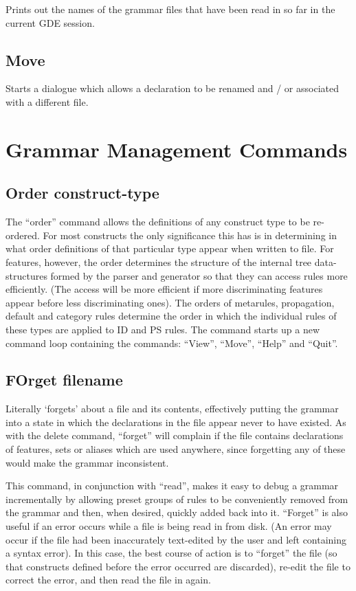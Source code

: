Prints out the names of the grammar files that have been read
in so far in the current GDE session.

\subsection{Move}

Starts a dialogue which allows a declaration to be renamed and / or
associated with a different file.

\section{Grammar Management Commands}

\subsection{Order construct-type}

The ``order'' command allows the definitions of any construct
type to be re-ordered. For most constructs the only significance this
has is in determining in what order definitions of that particular type
appear when written to file. For features, however, the order determines
the structure of the internal tree data-structures formed by the parser
and generator so that they can access rules more efficiently. (The access
will be more efficient if more discriminating features appear before less
discriminating ones). The orders of metarules, propagation, default and
category rules determine the order in which the individual rules of
these types are applied to ID and PS rules. The command starts up a new
command loop containing the commands: ``View'', ``Move'', ``Help'' and ``Quit''.

\subsection{FOrget filename}

Literally `forgets' about a file and its contents, effectively
putting the grammar into a state in which the declarations in the file
appear never to have existed. As with the delete
command, ``forget'' will complain if the file contains declarations of
features, sets or aliases which are used anywhere, since forgetting
any of these would make the grammar inconsistent.

This command, in conjunction with ``read'', makes it easy to debug a
grammar incrementally by allowing preset groups of rules to be
conveniently removed from the grammar and then, when desired, quickly
added back into it. ``Forget'' is also useful if an error occurs while a
file is being read in from disk. (An error may occur if the file had been
inaccurately text-edited by the user and left containing a syntax error).
In this case, the best course of action is to ``forget'' the file (so that
constructs defined before the error occurred are discarded), re-edit the
file to correct the error, and then read the file in again.


